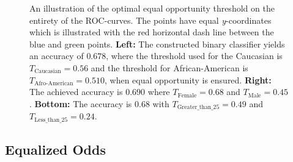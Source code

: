 \documentclass[11pt, fleqn, titlepage]{article}
\begin{document}
\begin{figure}[H]
\begin{center}
\begin{subfigure}{0.5\textwidth}
		\end{subfigure}
		\end{center}
		\caption{An illustration of the optimal equal opportunity threshold on the entirety of the ROC-curves. The points have equal \textit{y}-coordinates which is illustrated with the red horizontal dash line between the blue and green points. \textbf{Left:} The constructed binary classifier yields an accuracy of $ 0.678 $, where the threshold used for the Caucasian is $T_{\text{Caucasian}}= 0.56 $ and the threshold for African-American is $ T_{\text{Afro-American}}=0.510 $, when equal opportunity is ensured. \textbf{Right:} The achieved accuracy is $0.690$ where $T_{\text{Female}}= 0.68$ and $T_{\text{Male}}= 0.45$. \textbf{Bottom:} The accuracy is $0.68$ with $T_{\text{Greater\_than\_{25}}}= 0.49$ and $T_{\text{Less\_than\_{25}}}= 0.24$.}
		\label{fig:equal-opportunity-optimal}
	\end{figure}
	\vspace*{-0.3cm}
	\subsection{Equalized Odds}\label{equalizedOdds}
	
\end{document}
